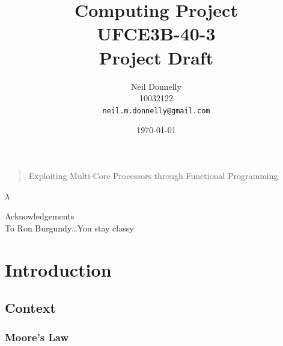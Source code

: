\documentclass[12pt,a4paper]{article}
\title{Computing Project\\UFCE3B-40-3\\Project Draft}
\author{Neil Donnelly\\10032122\\
\texttt{neil.m.donnelly@gmail.com}
}
\date{\today}
\begin{document}
\maketitle
\thispagestyle{empty}

\begin{quote}
    \begin{center}\Large Exploiting Multi-Core Processors through Functional Programming
    \end{center}
\end{quote}
    \begin{center}
        {\fontsize{50}{60}\selectfont $\lambda$}
    \end{center}
\newpage

\doublespacing
\pagestyle{empty}

\vspace*{\fill}
    \begin{center}
        \Large Acknowledgements \\
        \large
        To Ron Burgundy\ldots You stay classy\\
    \end{center}
\vspace*{\fill}
\newpage

\begin{abstract}
\lipsum[1-2]
\end{abstract}
\newpage

\pagestyle{plain}
\setcounter{page}{1}
\tableofcontents

\newpage

\pagestyle{plain}
\setcounter{page}{1}

\doublespacing

\renewcommand{\harvardand}{\&}

\section{Introduction}
\subsection{Context}
\subsubsection{Moore's Law}
\end{document}
